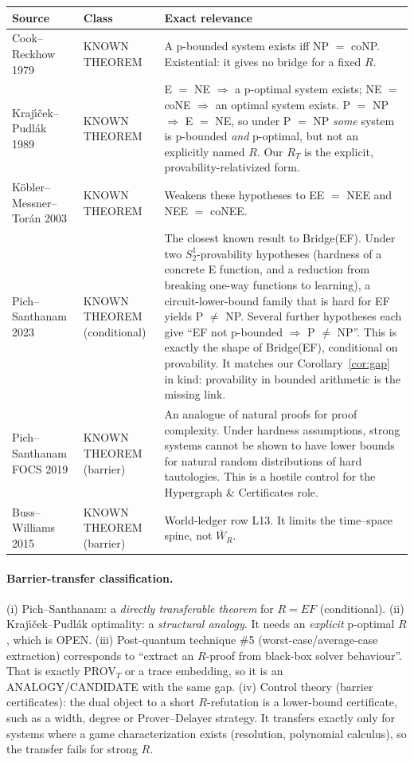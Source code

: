 \documentclass[11pt]{article}
\theoremstyle{definition}
\theoremstyle{remark}
\newcommand{\Wb}{\overline W}
\begin{document}
\begin{table}[h]
\centering\small
\begin{tabular}{p{4.4cm}p{3.1cm}p{7.2cm}}
\toprule
Source & Class & Exact relevance\\
\midrule
Cook--Reckhow 1979 \cite{cookreckhow1979} & KNOWN THEOREM & A p-bounded system exists iff NP $=$ coNP. Existential: it gives no bridge for a fixed $R$.\\
Kraj\'{\i}\v{c}ek--Pudl\'ak 1989 \cite{krajicekpudlak1989} & KNOWN THEOREM & E $=$ NE $\Rightarrow$ a p-optimal system exists; NE $=$ coNE $\Rightarrow$ an optimal system exists. P $=$ NP $\Rightarrow$ E $=$ NE, so under P $=$ NP \emph{some} system is p-bounded \emph{and} p-optimal, but not an explicitly named $R$. Our $R_T$ is the explicit, provability-relativized form.\\
K\"obler--Messner--Tor\'an 2003 & KNOWN THEOREM & Weakens these hypotheses to EE $=$ NEE and NEE $=$ coNEE.\\
Pich--Santhanam 2023 \cite{pichsanthanam2023} & KNOWN THEOREM (conditional) & The closest known result to Bridge(EF). Under two $S^1_2$-provability hypotheses (hardness of a concrete E function, and a reduction from breaking one-way functions to learning), a circuit-lower-bound family that is hard for EF yields P $\ne$ NP. Several further hypotheses each give ``EF not p-bounded $\Rightarrow$ P $\ne$ NP''. This is exactly the shape of Bridge(EF), conditional on provability. It matches our Corollary~\ref{cor:gap} in kind: provability in bounded arithmetic is the missing link.\\
Pich--Santhanam FOCS 2019 \cite{pichsanthanam2019} & KNOWN THEOREM (barrier) & An analogue of natural proofs for proof complexity. Under hardness assumptions, strong systems cannot be shown to have lower bounds for natural random distributions of hard tautologies. This is a hostile control for the Hypergraph \& Certificates role.\\
Buss--Williams 2015 \cite{busswilliams2015} & KNOWN THEOREM (barrier) & World-ledger row L13. It limits the time--space spine, not $\Wb_R$.\\
\bottomrule
\end{tabular}
\end{table}

\paragraph{Barrier-transfer classification.}
(i) Pich--Santhanam: a \emph{directly transferable theorem} for $R=EF$
(conditional). (ii) Kraj\'{\i}\v{c}ek--Pudl\'ak optimality: a \emph{structural analogy}.
It needs an \emph{explicit} p-optimal $R$, which is OPEN. (iii) Post-quantum
technique \#5 (worst-case/average-case extraction) corresponds to
``extract an $R$-proof from black-box solver behaviour''. That is exactly
PROV$_T$ or a trace embedding, so it is an ANALOGY/CANDIDATE with the same
gap. (iv) Control theory (barrier certificates): the dual object to a short
$R$-refutation is a lower-bound certificate, such as a width, degree or
Prover--Delayer strategy. It transfers exactly only for systems where a
game characterization exists (resolution, polynomial calculus), so the transfer
fails for strong $R$.
\end{document}
